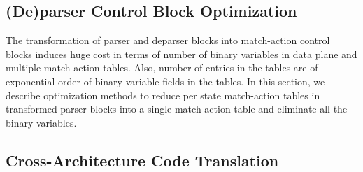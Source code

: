 \subsection{(De)parser Control Block Optimization}
The transformation of parser and deparser blocks into match-action control blocks induces huge cost in terms of number of binary variables in data plane and multiple match-action tables.
Also, number of entries in the tables are of exponential order of binary variable fields in the tables.
In this section, we describe optimization methods to reduce per state match-action tables in transformed parser blocks into a single match-action table and eliminate all the binary variables.
 
 


\subsection{Cross-Architecture Code Translation}

